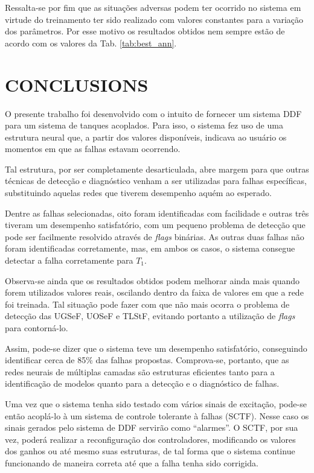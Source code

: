 \documentclass[10pt,fleqn,a4paper]{article}
\begin{document}
Ressalta-se por fim que as situações adversas podem ter ocorrido no sistema em
virtude do treinamento ter sido realizado com valores constantes para a variação
dos parâmetros. Por esse motivo os resultados obtidos nem sempre estão de acordo
com os valores da Tab. \ref{tab:best_ann}.

\section{CONCLUSIONS}\label{sec:conclusions}
O presente trabalho foi desenvolvido com o intuito de fornecer um sistema DDF
para um sistema de tanques acoplados. Para isso, o sistema fez uso de uma
estrutura neural que, a partir dos valores disponíveis, indicava ao usuário os
momentos em que as falhas estavam ocorrendo. 

Tal estrutura, por ser completamente desarticulada, abre margem para que outras
técnicas de detecção e diagnóstico venham a ser utilizadas para falhas
específicas, substituindo aquelas redes que tiverem desempenho aquém ao
esperado.

Dentre as falhas selecionadas, oito foram identificadas com facilidade e outras
três tiveram um desempenho satisfatório, com um pequeno problema de detecção que
pode ser facilmente resolvido através de {\it flags} binárias. As outras duas
falhas não foram identificadas corretamente, mas, em ambos os casos, o sistema
consegue detectar a falha corretamente para $T_1$.

Observa-se ainda que os resultados obtidos podem melhorar ainda mais quando
forem utilizados valores reais, oscilando dentro da faixa de valores em que a
rede foi treinada. Tal situação pode fazer com que não mais ocorra o problema de
detecção das UGSeF, UOSeF e TLStF, evitando portanto a utilização de {\it
flags} para contorná-lo.

Assim, pode-se dizer que o sistema teve um desempenho satisfatório, conseguindo
identificar cerca de 85\% das falhas propostas. Comprova-se, portanto, que as
redes neurais de múltiplas camadas são estruturas eficientes tanto para a
identificação de modelos quanto para a detecção e o diagnóstico de falhas.

Uma vez que o sistema tenha sido testado com vários sinais de excitação, pode-se
então acoplá-lo à um sistema de controle tolerante à falhas (SCTF). Nesse caso
os sinais gerados pelo sistema de DDF servirão como ``alarmes''. O SCTF, por sua
vez, poderá realizar a reconfiguração dos controladores, modificando os valores
dos ganhos ou até mesmo suas estruturas, de tal forma que o sistema continue
funcionando de maneira correta até que a falha tenha sido corrigida.
\end{document}

